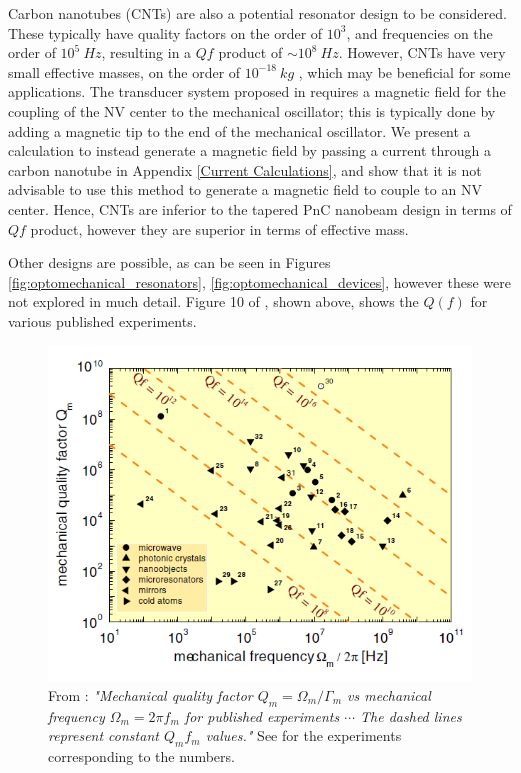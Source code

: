 \documentclass[%
 reprint,
nofootinbib,
 amsmath,amssymb,
 aps,
]{revtex4-2}
\begin{document}
Carbon nanotubes (CNTs) are also a potential resonator design to be considered. These typically have quality factors on the order of $10^3$, and frequencies on the order of $10^5 \ Hz$, resulting in a $Qf$ product of $\sim 10^8 \ Hz$. However, CNTs have very small effective masses, on the order of $10^{-18} \ kg$ \cite{CNT_resonator}, which may be beneficial for some applications. The transducer system proposed in \cite{project_paper} requires a magnetic field for the coupling of the NV center to the mechanical oscillator; this is typically done by adding a magnetic tip to the end of the mechanical oscillator. We present a calculation to instead generate a magnetic field by passing a current through a carbon nanotube in Appendix \ref{Current Calculations}, and show that it is not advisable to use this method to generate a magnetic field to couple to an NV center. Hence, CNTs are inferior to the tapered PnC nanobeam design in terms of $Qf$ product, however they are superior in terms of effective mass. 
\newline

Other designs are possible, as can be seen in Figures \ref{fig:optomechanical_resonators}, \ref{fig:optomechanical_devices}, however these were not explored in much detail. Figure 10 of \cite{cavity_optomechanics_2014}, shown above, shows the $Q(f)$ for various published experiments.

\begin{figure}
    \centering
    \includegraphics[width = \columnwidth]{Qf_other_designs.PNG}
    \caption{From \cite{cavity_optomechanics_2014}: \textit{"Mechanical quality factor $Q_m = \Omega_m / \Gamma_m$ vs mechanical frequency $\Omega_m = 2\pi f_m$ for published experiments $\cdots$ The dashed lines represent constant $Q_m f_m$ values."} See \cite{cavity_optomechanics_2014} for the experiments corresponding to the numbers.}
    \label{fig:Qf_other_designs}
\end{figure}
\end{document}

